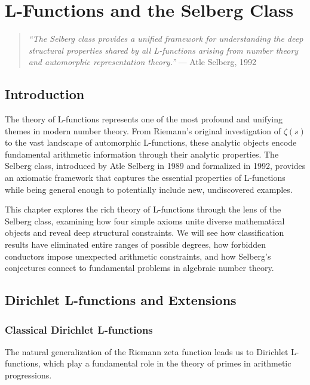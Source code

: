 \chapter{L-Functions and the Selberg Class}
\label{ch:l-functions}

\begin{quote}
\textit{``The Selberg class provides a unified framework for understanding the deep structural properties shared by all L-functions arising from number theory and automorphic representation theory.''} --- Atle Selberg, 1992
\end{quote}

\section{Introduction}

The theory of L-functions represents one of the most profound and unifying themes in modern number theory. From Riemann's original investigation of $\zeta(s)$ to the vast landscape of automorphic L-functions, these analytic objects encode fundamental arithmetic information through their analytic properties. The Selberg class, introduced by Atle Selberg in 1989 and formalized in 1992, provides an axiomatic framework that captures the essential properties of L-functions while being general enough to potentially include new, undiscovered examples.

This chapter explores the rich theory of L-functions through the lens of the Selberg class, examining how four simple axioms unite diverse mathematical objects and reveal deep structural constraints. We will see how classification results have eliminated entire ranges of possible degrees, how forbidden conductors impose unexpected arithmetic constraints, and how Selberg's conjectures connect to fundamental problems in algebraic number theory.

\section{Dirichlet L-functions and Extensions}
\label{sec:dirichlet-l-functions}

\subsection{Classical Dirichlet L-functions}

The natural generalization of the Riemann zeta function leads us to Dirichlet L-functions, which play a fundamental role in the theory of primes in arithmetic progressions.

